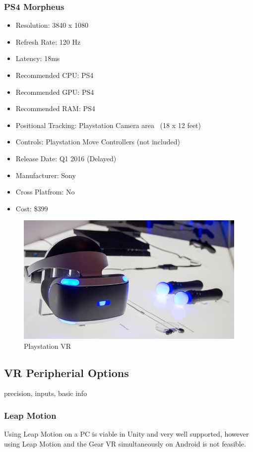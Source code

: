 \documentclass[a4paper,10pt]{article}
\begin{document}
\subsubsection{PS4 Morpheus}
\begin{itemize}
  \item Resolution: 3840 x 1080
  \item Refresh Rate: 120 Hz
  \item Latency: 18ms
  \item Recommended CPU: PS4
  \item Recommended GPU: PS4
  \item Recommended RAM: PS4
  \item Positional Tracking: Playstation Camera area ~(18 x 12 feet)
  \item Controls: Playstation Move Controllers (not included)
  \item Release Date: Q1 2016 (Delayed)
  \item Manufacturer: Sony
  \item Cross Platfrom: No
  \item Cost: \$399
\end{itemize}
\begin{figure}[H]
	\includegraphics[width=\linewidth,height=\paperheight,keepaspectratio]{morpheus.jpg}
	\caption{Playstation VR}
	\label{fig:psvrImg}
	\end{figure}
	\pagebreak
	
\pagebreak
\subsection{VR Peripherial Options}
precision, inputs, basic info
\subsubsection{Leap Motion}
	Using Leap Motion on a PC is viable in Unity and very well supported, however using Leap Motion and the Gear VR simultaneously on Android is not feasible.
\end{document}

